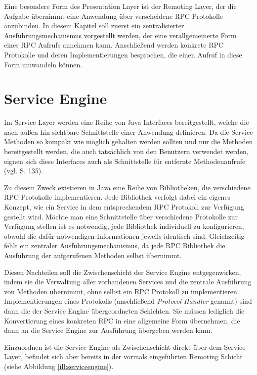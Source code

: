 \label{chap:remotinglayer}
Eine besondere Form des Presentation Layer ist der Remoting Layer, der die
Aufgabe übernimmt eine Anwendung über verscheidene \ac{RPC} Protokolle
anzubinden. In diesem Kapitel soll zuerst ein zentralisierter
Ausführungsmechanismus vorgestellt werden, der eine verallgemeinerte Form eines
\ac{RPC} Aufrufs annehmen kann. Anschließend werden konkrete \ac{RPC} Protokolle
und deren Implementierungen besprochen, die einen Aufruf in diese Form umwandeln
können.

\section{Service Engine}\label{sec:serviceengine}
Im Service Layer werden eine Reihe von Java Interfaces bereitgestellt, welche die
nach außen hin sichtbare Schnittstelle einer Anwendung definieren. Da die Service
Methoden so kompakt wie möglich gehalten werden sollten und nur die Methoden
bereitgestellt werden, die auch tatsächlich von den Benutzern verwendet werden,
eignen sich diese Interfaces auch als Schnittstelle für entfernte Methodenaufrufe
(vgl. \cite{fowler:2002} S. 135).

Zu diesem Zweck existieren in Java eine Reihe von Bibliotheken, die verschiedene
\ac{RPC} Protokolle implementieren. Jede Bibliothek verfolgt dabei ein eigenes
Konzept, wie ein Service in dem entsprechendem \ac{RPC} Protokoll zur Verfügung
gestellt wird. Möchte man eine Schnittstelle über verschiedene Protokolle zur
Verfügung stellen ist es notwendig, jede Bibliothek individuell zu
konfigurieren, obwohl die dafür notwendigen Informationen jeweils identisch sind. Gleichzeitig
fehlt ein zentraler Ausführungsmechanismus, da jede \ac{RPC} Bibliothek die
Ausführung der aufgerufenen Methoden selbst übernimmt.

Diesen Nachteilen soll die Zwischenschicht der Service Engine entgegenwirken,
indem sie die Verwaltung aller vorhandenen Services und die zentrale Ausführung
von Methoden übernimmt, ohne selbst ein \ac{RPC} Protokoll zu implementieren.
Implementierungen eines Protokolls (anschließend \emph{Protocol Handler} genannt)
sind dann die der Service Engine übergeordneten Schichten. Sie müssen lediglich
die Konvertierung eines konkreten \ac{RPC} in eine allgemeine Form übernehmen, die
dann an die Service Engine zur Ausführung übergeben werden kann.

Einzuordnen ist die Service Engine als Zwischenschicht direkt über dem Service
Layer, befindet sich aber bereits in der vormals eingeführten Remoting Schicht
(siehe Abbildung \ref{ill:serviceengine}).

